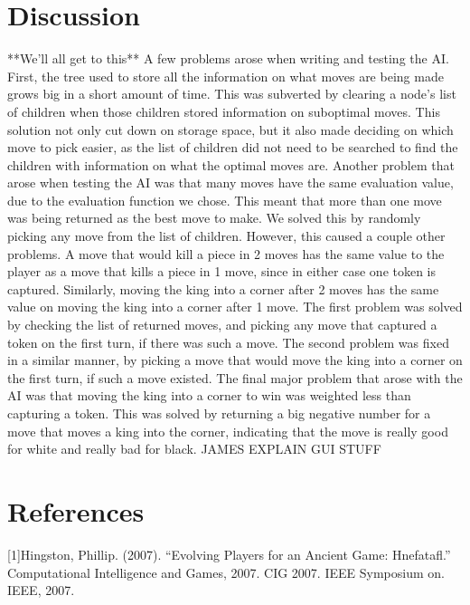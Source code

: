 \documentclass{article}
\begin{document}
\section{Discussion}
**We'll all get to this**
	A few problems arose when writing and testing the AI. First, the tree used to store all the information on what moves are being made grows big in a short amount of time. This was subverted by clearing a node's list of children when those children stored information on suboptimal moves. This solution not only cut down on storage space, but it also made deciding on which move to pick easier, as the list of children did not need to be searched to find the children with information on what the optimal moves are. Another problem that arose when testing the AI was that many moves have the same evaluation value, due to the evaluation function we chose. This meant that more than one move was being returned as the best move to make. We solved this by randomly picking any move from the list of children. However, this caused a couple other problems. A move that would kill a piece in 2 moves has the same value to the player as a move that kills a piece in 1 move, since in either case one token is captured. Similarly, moving the king into a corner after 2 moves has the same value on moving the king into a corner after 1 move. The first problem was solved by checking the list of returned moves, and picking any move that captured a token on the first turn, if there was such a move. The second problem was fixed in a similar manner, by picking a move that would move the king into a corner on the first turn, if such a move existed. The final major problem that arose with the AI was that moving the king into a corner to win was weighted less than capturing a token. This was solved by returning a big negative number for a move that moves a king into the corner, indicating that the move is really good for white and really bad for black. 
	JAMES EXPLAIN GUI STUFF


\section{References}
[1]Hingston, Phillip. (2007). “Evolving Players for an Ancient Game: Hnefatafl.” Computational Intelligence and Games, 2007. CIG 2007. IEEE Symposium on. IEEE, 2007.
\end{document}
